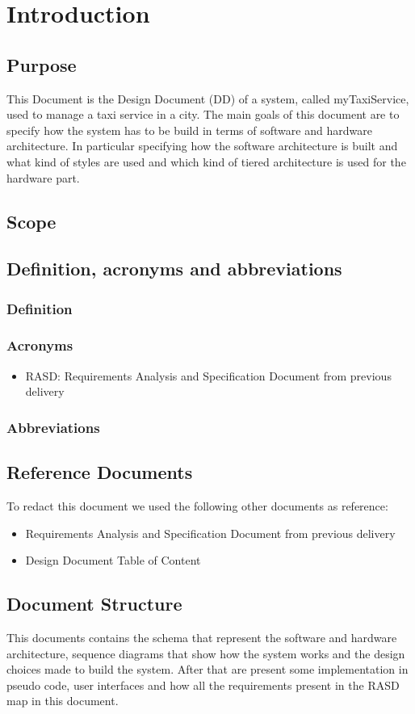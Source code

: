 \section{Introduction}
\subsection{Purpose}
	This Document is the Design Document (DD) of a system, called myTaxiService, used to manage  a taxi service in a city. The main goals of this document are to specify how the system has to be build in terms of software and hardware architecture. In particular specifying how the software architecture is built and what kind of styles are used and which kind of tiered architecture is used for the hardware part.
\subsection{Scope}
	
\subsection{Definition, acronyms and abbreviations}
	\subsubsection{Definition}
	\subsubsection{Acronyms}
		 \begin{itemize}
		 	\item RASD: Requirements Analysis and Specification Document from previous delivery
		 \end{itemize}
	\subsubsection{Abbreviations}
\subsection{Reference Documents}
	To redact this document we used the following other documents as reference:
	\begin{itemize}
		\item Requirements Analysis and Specification Document from previous delivery
		\item Design Document Table of Content 
	\end{itemize}
\subsection{Document Structure}
	This documents contains the schema that represent the software and hardware architecture, sequence diagrams that show how the system works and the design choices made to build the system. After that are present some implementation in pseudo code, user interfaces and how all the requirements present in the RASD map in this document.